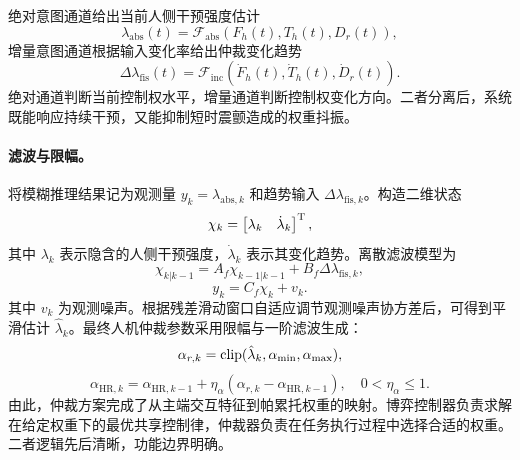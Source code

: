 绝对意图通道给出当前人侧干预强度估计
\begin{equation}
  \lambda_{\mathrm{abs}}(t)=\mathcal{F}_{\mathrm{abs}}(F_h(t),T_h(t),D_r(t)),
  \label{eq:ch3_abs_fis}
\end{equation}
增量意图通道根据输入变化率给出仲裁变化趋势
\begin{equation}
  \Delta\lambda_{\mathrm{fis}}(t)=\mathcal{F}_{\mathrm{inc}}(\dot F_h(t),\dot T_h(t),\dot D_r(t)).
  \label{eq:ch3_inc_fis}
\end{equation}
绝对通道判断当前控制权水平，增量通道判断控制权变化方向。二者分离后，系统既能响应持续干预，又能抑制短时震颤造成的权重抖振。

\paragraph{滤波与限幅。}
\label{subsec:ch3_alpha_filtering}

将模糊推理结果记为观测量 $y_k=\lambda_{\mathrm{abs},k}$ 和趋势输入 $\Delta\lambda_{\mathrm{fis},k}$。构造二维状态
\begin{equation}
  \chi_k=\begin{bmatrix}\lambda_k&\dot\lambda_k\end{bmatrix}^{\mathrm{T}},
  \label{eq:ch3_kf_state}
\end{equation}
其中 $\lambda_k$ 表示隐含的人侧干预强度，$\dot\lambda_k$ 表示其变化趋势。离散滤波模型为
\begin{equation}
  \chi_{k|k-1}=A_f\chi_{k-1|k-1}+B_f\Delta\lambda_{\mathrm{fis},k},
  \label{eq:ch3_kf_predict}
\end{equation}
\begin{equation}
  y_k=C_f\chi_k+v_k .
  \label{eq:ch3_kf_obs}
\end{equation}
其中 $v_k$ 为观测噪声。根据残差滑动窗口自适应调节观测噪声协方差后，可得到平滑估计 $\hat\lambda_k$。最终人机仲裁参数采用限幅与一阶滤波生成：
\begin{equation}
  \alpha_{r,k}=\operatorname{clip}(\hat\lambda_k,\alpha_{\min},\alpha_{\max}),
  \label{eq:ch3_alpha_r}
\end{equation}
\begin{equation}
  \alpha_{\mathrm{HR},k}=\alpha_{\mathrm{HR},k-1}+\eta_\alpha(\alpha_{r,k}-\alpha_{\mathrm{HR},k-1}),
  \quad 0<\eta_\alpha\le 1 .
  \label{eq:ch3_alpha_filter}
\end{equation}
由此，仲裁方案完成了从主端交互特征到帕累托权重的映射。博弈控制器负责求解在给定权重下的最优共享控制律，仲裁器负责在任务执行过程中选择合适的权重。二者逻辑先后清晰，功能边界明确。
